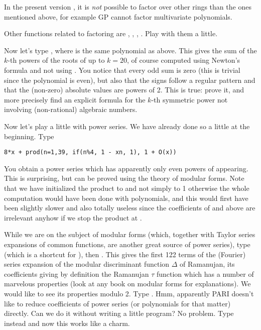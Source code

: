  In the present version \vers{}, it is {\it not} possible to factor over
other rings than the ones mentioned above, for example GP cannot factor
multivariate polynomials. \smallskip

Other functions related to factoring are , ,
, . Play with them a little.

Now let's type , where  is the same
polynomial as above. This gives the sum of the $k$-th powers of the roots
of  up to $k=20$, of course computed using Newton's formula and
not using . You notice that every odd sum is zero (this is
trivial since the polynomial is even), but also that the signs follow a
regular pattern and that the  (non-zero) absolute values are powers of 2.
This is true: prove it, and more precisely find an explicit formula for the
$k$-th symmetric power not involving (non-rational) algebraic numbers.
\medskip

Now let's play a little with power series. We have already done so a little
at the beginning.  Type

\centerline{\tt 8*x + prod(n=1,39, if(n\%4, 1 - x\pow n, 1),
                           1 + O(x))}

  You obtain a power series which has apparently only even powers of 
appearing. This is surprising, but can be proved using the theory of modular
forms. Note that we have initialized the product to  and
not simply to 1 otherwise the whole computation would have been done with
polynomials, and this would first have been slightly slower and also totally
useless since the coefficients of  and above are irrelevant
anyhow if we stop the product at .

While we are on the subject of modular forms (which, together with Taylor
series expansions of common functions, are another great source of power
series), type  (which is a shortcut for
), then . This
gives the first 122 terms of the (Fourier) series expansion of the modular
discriminant function $\Delta$ of Ramanujan, its coefficients giving by
definition the Ramanujan $\tau$ function which has a number of marvelous
properties (look at any book on modular forms for explanations). We would like
to see its properties modulo 2. Type . Hmm, apparently PARI
doesn't like to
reduce coefficients of power series (or polynomials for that matter) directly.
Can we do it without writing a little program? No problem. Type instead
 and now this works like a charm.

